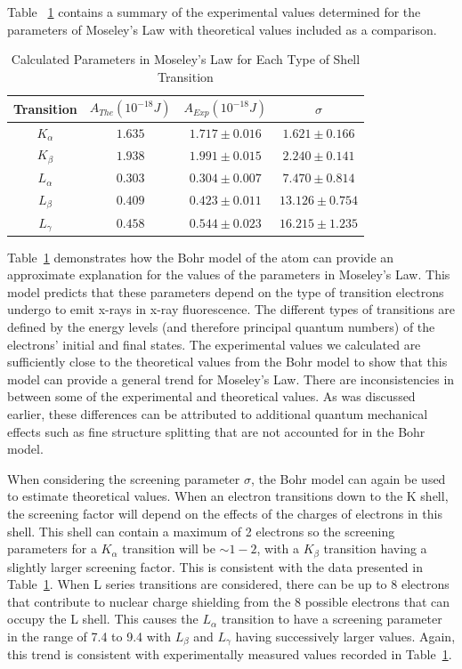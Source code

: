 \documentclass[%
 reprint,
 amsmath,amssymb,
 aps,
 pra,
]{revtex4-1}
\begin{document}
Table ~\ref{Tab:MoseLawSummary} contains a summary of the experimental values determined for the parameters of Moseley's Law with theoretical values included as a comparison.

\begin{table}[htbp]
	\begin{center}
		\begin{tabular}{|c|c|c|c|}
			\hline Transition & $A_{The} (10^{-18} J)$  & $A_{Exp} (10^{-18} J) $ & $\sigma$ \\
			\hline $K_{\alpha}$ & $1.635$ & $1.717 \pm 0.016$ & $1.621 \pm 0.166$ \\
			\hline $K_{\beta}$ & $1.938$ & $1.991 \pm 0.015$ & $2.240 \pm 0.141$ \\
			\hline $L_{\alpha}$ & $0.303$ & $0.304 \pm 0.007$ & $7.470 \pm 0.814$ \\
			\hline $L_{\beta}$ & $0.409$ & $0.423 \pm 0.011$ & $13.126 \pm 0.754$ \\
			\hline $L_{\gamma}$ & $0.458$ & $0.544 \pm 0.023$ & $16.215 \pm 1.235$ \\
			\hline
		\end{tabular}
	\end{center}
	\caption{Calculated Parameters in Moseley's Law for Each Type of Shell Transition}
	\label{Tab:MoseLawSummary}
\end{table}

Table~\ref{Tab:MoseLawSummary} demonstrates how the Bohr model of the atom can provide an approximate explanation for the values of the parameters in Moseley's Law. This model predicts that these parameters depend on the type of transition electrons undergo to emit x-rays in x-ray fluorescence. The different types of transitions are defined by the energy levels (and therefore principal quantum numbers) of the electrons' initial and final states. The experimental values we calculated are sufficiently close to the theoretical values from the Bohr model to show that this model can provide a general trend for Moseley's Law. There are inconsistencies in between some of the experimental and theoretical values. As was discussed earlier, these differences can be attributed to additional quantum mechanical effects such as fine structure splitting that are not accounted for in the Bohr model.

When considering the screening parameter $\sigma$, the Bohr model can again be used to estimate theoretical values. When an electron transitions down to the K shell, the screening factor will depend on the effects of the charges of electrons in this shell. This shell can contain a maximum of 2 electrons so the screening parameters for a $K_{\alpha}$ transition will be $\sim 1-2$, with a $K_{\beta}$ transition having a slightly larger screening factor. This is consistent with the data presented in Table~\ref{Tab:MoseLawSummary}. When L series transitions are considered, there can be up to 8 electrons that contribute to nuclear charge shielding from the 8 possible electrons that can occupy the L shell. This causes the $L_{\alpha}$ transition to have a screening parameter in the range of 7.4 to 9.4 with $L_{\beta}$ and $L_{\gamma}$ having successively larger values. Again, this trend is consistent with experimentally measured values recorded in Table~\ref{Tab:MoseLawSummary}.
\end{document}
